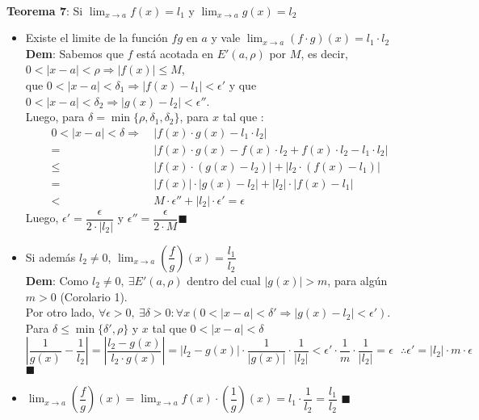 \documentclass[11pt,a4paper]{article}
\newcommand*{\QEDA}{\null\nobreak\hfill\ensuremath{\blacksquare}}
\begin{document}
\noindent \dotfill\\

\newpage

\noindent \textbf{Teorema 7}: Si $\displaystyle{\lim_{x\to a}f(x) = l_1}$ y $\displaystyle{\lim_{x\to a}g(x) = l_2}$
\begin{itemize}
\item Existe el limite de la funci\'on $fg$ en $a$ y vale $\displaystyle{\lim_{x\to a}(f\cdot g)(x) = l_1\cdot l_2}$\\
\textbf{Dem}: Sabemos que $f$ est\'a acotada en $E'(a, \rho)$ por $M$, es decir, $0<|x-a|<\rho \Rightarrow |f(x)|\leq M$,\\
que $0<|x-a|<\delta_1 \Rightarrow |f(x)-l_1| < \epsilon'$ y que $0<|x-a|<\delta_2 \Rightarrow |g(x)-l_2| < \epsilon''$.\\
Luego, para $\delta = \min\{\rho, \delta_1, \delta_2\}$, para $x$ tal que :
\begin{align*}
0<|x-a|<\delta \Rightarrow \ &|f(x)\cdot g(x) - l_1\cdot l_2|\\
= \ &|f(x)\cdot g(x) - f(x)\cdot l_2 + f(x)\cdot l_2 - l_1\cdot l_2|\\
\leq \ &|f(x)\cdot (g(x) - l_2)| + |l_2 \cdot (f(x) - l_1)|\\
= \ &|f(x)|\cdot |g(x) - l_2| + |l_2| \cdot |f(x) - l_1|\\
< \ & M \cdot \epsilon'' + |l_2| \cdot \epsilon' = \epsilon
\end{align*}
Luego, $\epsilon' = \dfrac{\epsilon}{2\cdot |l_2|}$ y $\epsilon'' = \dfrac{\epsilon}{2\cdot M}$\QEDA
\item Si adem\'as $l_2 \not = 0$, $\displaystyle{\lim_{x\to a}\left(\dfrac{f}{g}\right)(x) = \dfrac{l_1}{l_2}}$\\
\textbf{Dem}: Como $l_2 \not = 0,\ \exists E'(a,\rho)$ dentro del cual $|g(x)| > m$, para alg\'un $m>0$ (Corolario 1).\\
Por otro lado, $\forall \epsilon>0,\ \exists \delta>0 : \forall x (0<|x-a|<\delta' \Rightarrow |g(x)-l_2| < \epsilon')$.\\
Para $\delta\leq \min\{\delta', \rho\}$ y $x$ tal que $0<|x-a|<\delta$\\ $\left|\dfrac{1}{g(x)} - \dfrac{1}{l_2}\right| = \left|\dfrac{l_2-g(x)}{l_2\cdot g(x)}\right| = |l_2-g(x)| \cdot \dfrac{1}{|g(x)|} \cdot \dfrac{1}{|l_2|} < \epsilon' \cdot \dfrac{1}{m} \cdot \dfrac{1}{|l_2|} = \epsilon\ \ \ \therefore \epsilon' = |l_2| \cdot m \cdot \epsilon$ \QEDA
\item $\displaystyle{\lim_{x\to a}\left(\dfrac{f}{g}\right)(x) = \lim_{x\to a}f(x) \cdot \left(\dfrac{1}{g}\right)(x) = l_1 \cdot \dfrac{1}{l_2} = \dfrac{l_1}{l_2}}$ \QEDA
\end{itemize}
\end{document}
